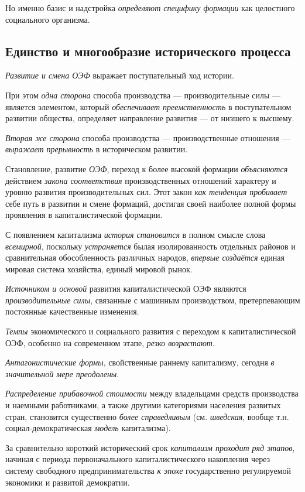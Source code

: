 \documentclass[a4paper,14pt,russian]{extreport}
\begin{document}
Но именно базис и надстройка \emph{определяют специфику формации} как целостного социального организма.

\subsection{Единство и многообразие исторического процесса}

\emph{Развитие и смена ОЭФ} выражает поступательный ход истории.

При этом \emph{одна сторона} способа производства --- производительные силы --- является элементом, который \emph{обеспечивает преемственность} в поступательном развитии общества, определяет направление развития --- от низшего к высшему.

\emph{Вторая же сторона} способа производства --- производственные отношения --- \emph{выражает прерывность} в историческом развитии.

Становление, развитие \emph{ОЭФ}, переход к более высокой формации \emph{объясняются} действием \emph{закона соответствия} производственных отношений характеру и уровню развития производительных сил. Этот закон \emph{как тенденция пробивает} себе путь в развитии и смене формаций, достигая своей наиболее полной формы проявления в капиталистической формации.

С появлением капитализма \emph{история становится} в полном смысле слова \emph{всемирной}, поскольку \emph{устраняется} былая изолированность отдельных районов и сравнительная обособленность различных народов, \emph{впервые создаётся} единая мировая система хозяйства, единый мировой рынок.

\emph{Источником и основой} развития капиталистической ОЭФ являются \emph{производительные силы}, связанные с машинным производством, претерпевающим постоянные качественные изменения.

\emph{Темпы} экономического и социального развития с переходом к капиталистической ОЭФ, особенно на современном этапе, \emph{резко возрастают}.

\emph{Антагонистические формы}, свойственные раннему капитализму, сегодня \emph{в значительной мере преодолены}.

\emph{Распределение прибавочной стоимости} между владельцами средств производства и наемными работниками, а также другими категориями населения развитых стран, становится существенно \emph{более справедливым} (см. \emph{шведская}, вообще т.н. социал-демократическая \emph{модель} капитализма).

За сравнительно короткий исторический срок \emph{капитализм проходит ряд этапов}, начиная с периода первоначального капиталистического накопления через систему свободного предпринимательства \emph{к эпохе} государственно регулируемой экономики и развитой демократии.
\end{document}
